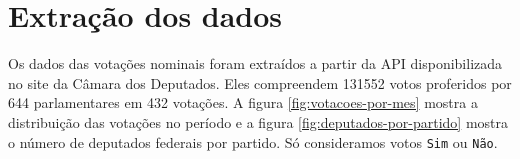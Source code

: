{\begin{knitrout}
\begin{kframe}
{\ttfamily\noindent\bfseries{}}\end{kframe}
\end{knitrout}

%

\section{Extração dos dados}

\begin{knitrout}
\color{fgcolor}\begin{kframe}
\begin{alltt}
 \hlkwb{<-} \hlstd{(}\hlopt{!}\hlstd{(votes[,} \hlopt{:}\hlstd{(votes)]))}
 \hlkwb{<-}  \hlopt{-} 
\end{alltt}
\end{kframe}
\end{knitrout}

Os dados das votações nominais foram extraídos a partir da API disponibilizada
no site da Câmara dos Deputados. Eles compreendem 131552 votos
proferidos por 644 parlamentares em 432
votações. A figura \ref{fig:votacoes-por-mes} mostra a distribuição das
votações no período e a figura \ref{fig:deputados-por-partido} mostra o número
de deputados federais por partido. Só consideramos votos \verb|Sim| ou
\verb|Não|.  

}
